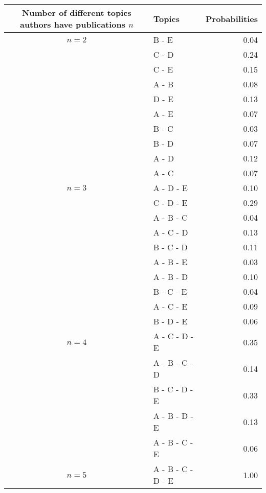 \begin{tabular}{clr}
\toprule
Number of different topics authors have publications \(n\) &  Topics &  Probabilities \\
\midrule
\(n = 2\)&                  B - E &           0.04 \\
&                  C - D &           0.24 \\
&                  C - E &           0.15 \\
&                  A - B &           0.08 \\
&                  D - E &           0.13 \\
&                  A - E &           0.07 \\
&                  B - C &           0.03 \\
&                  B - D &           0.07 \\
&                  A - D &           0.12 \\
&                  A - C &           0.07 \\
\midrule
\(n = 3\)&              A - D - E &           0.10 \\
&              C - D - E &           0.29 \\
&              A - B - C &           0.04 \\
&              A - C - D &           0.13 \\
&              B - C - D &           0.11 \\
&              A - B - E &           0.03 \\
&              A - B - D &           0.10 \\
&              B - C - E &           0.04 \\
&              A - C - E &           0.09 \\
&              B - D - E &           0.06 \\
\midrule
\(n = 4\)&          A - C - D - E &           0.35 \\
&          A - B - C - D &           0.14 \\
&          B - C - D - E &           0.33 \\
&          A - B - D - E &           0.13 \\
&          A - B - C - E &           0.06 \\
\midrule
\(n = 5\)&      A - B - C - D - E &           1.00 \\
\bottomrule
\end{tabular}
